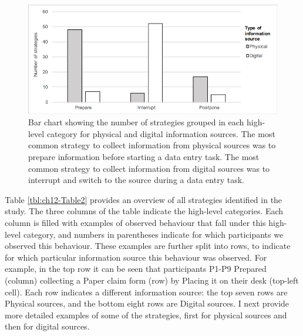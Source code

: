 \begin{figure}
\centering
\includegraphics[scale=0.8]{images/ch12/ch12_graph.pdf}
\caption{Bar chart showing the number of strategies grouped in each high-level category for physical and digital information sources. The most common strategy to collect information from physical sources was to prepare information before starting a data entry task. The most common strategy to collect information from digital sources was to interrupt and switch to the source during a data entry task.}
\label{fig:ch12_graph}
\end{figure}

Table \ref{tbl:ch12-Table2} provides an overview of all strategies identified in the study. The three columns of the table indicate the high-level categories. Each column is filled with examples of observed behaviour that fall under this high-level category, and numbers in parentheses indicate for which participants we observed this behaviour. These examples are further split into rows, to indicate for which particular information source this behaviour was observed. For example, in the top row it can be seen that participants P1-P9 Prepared (column) collecting a Paper claim form (row) by Placing it on their desk (top-left cell). Each row indicates a different information source: the top seven rows are Physical sources, and the bottom eight rows are Digital sources. I next provide more detailed examples of some of the strategies, first for physical sources and then for digital sources.

